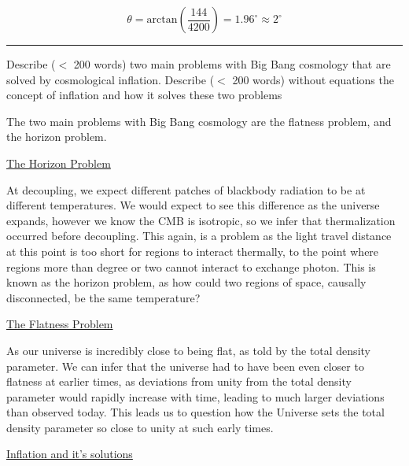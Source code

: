 \documentclass[11pt, a4paper, answers]{exam}
\begin{document}
\begin{questions}
\begin{solution}
        \begin{equation*}
            \theta = \text{arctan} \left(
            \frac{144}{4200}
            \right) = 1.96^\circ \approx 2^\circ
        \end{equation*}
        \[

        \]
    \end{solution}


    \begin{center}
        \rule{8cm}{0.4pt}
    \end{center}
    \newpage


    \question Describe ($<$ 200 words) two main problems with Big Bang cosmology that are solved by
    cosmological inflation. Describe ($<$ 200 words) without equations the concept of inflation and
    how it solves these two problems

    \begin{solution}
        The two main problems with Big Bang cosmology are the flatness problem, and the horizon
        problem.
        \newline

        \underline{The Horizon Problem}

        At decoupling, we expect different patches of blackbody radiation to be at different
        temperatures. We would expect to see this difference as the universe expands, however we
        know the CMB is isotropic, so we infer that thermalization occurred before decoupling.
        This again, is a problem as the light travel distance at this point is too short for regions
        to interact thermally, to the point where regions more than degree or two cannot interact
        to exchange photon. This is known as the horizon problem, as how could two regions of space,
        causally disconnected, be the same temperature?
        \newline

        \underline{The Flatness Problem}

        As our universe is incredibly close to being flat, as told by the total density parameter.
        We can infer that the universe had to have been even closer to flatness at earlier times,
        as deviations from unity from the total density parameter would rapidly increase with time,
        leading to much larger deviations than observed today. This leads us to question how the
        Universe sets the total density parameter so close to unity at such early times.

        \underline{Inflation and it's solutions}


\end{solution}
\end{questions}
\end{document}

